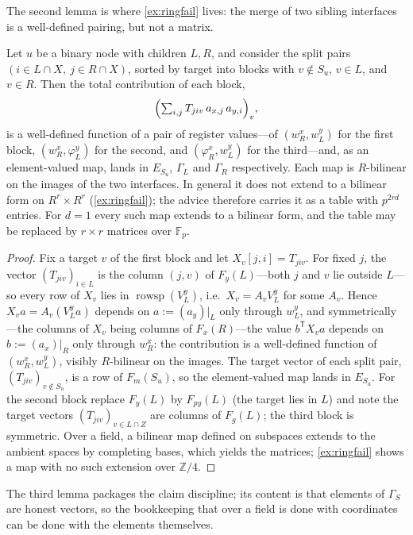\documentclass[a4paper,UKenglish,autoref,anonymous]{lipics-v2021}
\newcommand{\Fp}{\mathbb{F}_p}
\newcommand{\ZZ}{\mathbb{Z}}
\newcommand{\R}{R}                                   %
\newcommand{\rs}{\operatorname{rowsp}}
\begin{document}
The second lemma is where \autoref{ex:ringfail} lives: the merge of two
sibling interfaces is a well-defined pairing, but not a matrix.

\begin{lemma}
\label{lem:tables}
Let $u$ be a binary node with children $L, R$, and consider the split
pairs $(i \in L \cap X,\ j \in R \cap X)$, sorted by target into blocks
with $v \notin S_u$, $v \in L$, and $v \in R$. Then the total
contribution of each block,
\[
  \Bigl( \textstyle\sum_{i, j} T_{jiv}\, a_{x,j}\, a_{y,i} \Bigr)_{v},
\]
is a well-defined function of a pair of register values---of $(w^x_R,
w^y_L)$ for the first block, $(w^x_R, \varphi^y_L)$ for the second, and
$(\varphi^x_R, w^y_L)$ for the third---and, as an element-valued map,
lands in $E_{S_u}$, $\Gamma_L$ and $\Gamma_R$ respectively. Each map is
$\R$-bilinear on the images of the two interfaces. In general it does
not extend to a bilinear form on $\R^r \times \R^r$
(\autoref{ex:ringfail}); the advice therefore carries it as a table with
$p^{2rd}$ entries. For $d = 1$ every such map extends to a bilinear
form, and the table may be replaced by $r \times r$ matrices over
$\Fp$.
\end{lemma}

\begin{proof}
Fix a target $v$ of the first block and let $X_v[j, i] = T_{jiv}$. For
fixed $j$, the vector $(T_{jiv})_{i \in L}$ is the column $(j, v)$ of
$F_y(L)$---both $j$ and $v$ lie outside $L$---so every row of $X_v$ lies
in $\rs(V^y_L)$, i.e.\ $X_v = A_v V^y_L$ for some $A_v$. Hence $X_v a =
A_v (V^y_L a)$ depends on $a := (a_y)|_L$ only through $w^y_L$, and
symmetrically---the columns of $X_v$ being columns of $F_x(R)$---the
value $b^{\mathsf T} X_v a$ depends on $b := (a_x)|_R$ only through
$w^x_R$: the contribution is a well-defined function of $(w^x_R,
w^y_L)$, visibly $\R$-bilinear on the images. The target vector of each
split pair, $(T_{ji v})_{v \notin S_u}$, is a row of $F_m(S_u)$, so the
element-valued map lands in $E_{S_u}$. For the second block replace
$F_y(L)$ by $F_{py}(L)$ (the target lies in $L$) and note the target
vectors $(T_{jiv})_{v \in L \cap Z}$ are columns of $F_g(L)$; the third
block is symmetric. Over a field, a bilinear map defined on subspaces
extends to the ambient spaces by completing bases, which yields the
matrices; \autoref{ex:ringfail} shows a map with no such extension over
$\ZZ/4$.
\end{proof}

The third lemma packages the claim discipline; its content is that
elements of $\Gamma_S$ are honest vectors, so the bookkeeping that over
a field is done with coordinates can be done with the elements
themselves.
\end{document}
